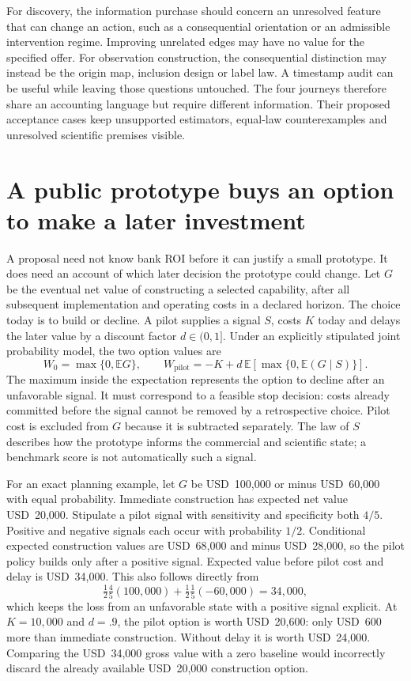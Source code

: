 For discovery, the information purchase should concern an unresolved feature
that can change an action, such as a consequential orientation or an admissible
intervention regime. Improving unrelated edges may have no value for the
specified offer. For observation construction, the consequential distinction
may instead be the origin map, inclusion design or label law. A timestamp
audit can be useful while leaving those questions untouched. The four journeys
therefore share an accounting language but require different information.
Their proposed acceptance cases keep unsupported estimators, equal-law
counterexamples and unresolved scientific premises visible.
\citep{exec14_l8_design}

\section{A public prototype buys an option to make a later investment}
\label{exec14:l8-option}

A proposal need not know bank ROI before it can justify a small prototype.
It does need an account of which later decision the prototype could change.
Let $G$ be the eventual net value of constructing a selected capability, after
all subsequent implementation and operating costs in a declared horizon.
The choice today is to build or decline. A pilot supplies a signal $S$, costs
$K$ today and delays the later value by a discount factor $d\in(0,1]$.
Under an explicitly stipulated joint probability model, the two option values
are
\[
 W_0=\max\{0,\mathbb E G\},\qquad
 W_{\mathrm{pilot}}=-K+d\,\mathbb E[\max\{0,\mathbb E(G\mid S)\}].
\]
The maximum inside the expectation represents the option to decline after
an unfavorable signal. It must correspond to a feasible stop decision: costs
already committed before the signal cannot be removed by a retrospective
choice. Pilot cost is excluded from $G$ because it is subtracted separately.
The law of $S$ describes how the prototype informs the commercial and scientific
state; a benchmark score is not automatically such a signal.
\citep{exec14_l8_economics}

For an exact planning example, let $G$ be USD~100,000 or minus USD~60,000 with
equal probability. Immediate construction has expected net value USD~20,000.
Stipulate a pilot signal with sensitivity and specificity both $4/5$. Positive
and negative signals each occur with probability $1/2$. Conditional expected
construction values are USD~68,000 and minus USD~28,000, so the pilot policy
builds only after a positive signal. Expected value before pilot cost and delay
is USD~34,000. This also follows directly from
\[
 \tfrac12\tfrac45(100{,}000)
       +\tfrac12\tfrac15(-60{,}000)=34{,}000,
\]
which keeps the loss from an unfavorable state with a positive signal explicit.
At $K=10{,}000$ and $d=.9$, the pilot option is worth USD~20,600: only USD~600
more than immediate construction. Without delay it is worth USD~24,000.
Comparing the USD~34,000 gross value with a zero baseline would incorrectly
discard the already available USD~20,000 construction option.
\citep{exec14_l8_economics}

